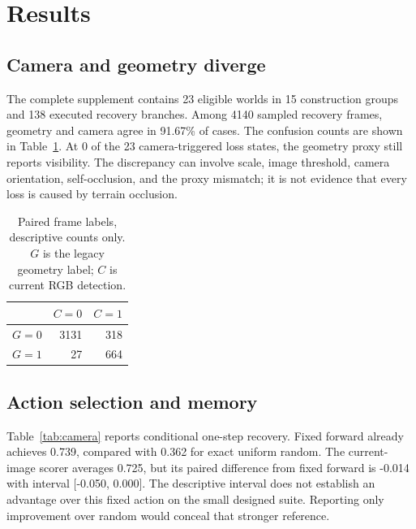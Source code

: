 \documentclass[10pt,twocolumn,a4paper]{article}
\begin{document}
\section{Results}
\subsection{Camera and geometry diverge}
The complete supplement contains 23 eligible worlds in 15 construction groups and 138 executed recovery branches. Among 4140 sampled recovery frames, geometry and camera agree in 91.67\% of cases. The confusion counts are shown in Table~\ref{tab:confusion}. At 0 of the 23 camera-triggered loss states, the geometry proxy still reports visibility. The discrepancy can involve scale, image threshold, camera orientation, self-occlusion, and the proxy mismatch; it is not evidence that every loss is caused by terrain occlusion.

\begin{table}[t]
\centering\small
\caption{Paired frame labels, descriptive counts only. $G$ is the legacy geometry label; $C$ is current RGB detection.}
\begin{tabular}{lrr}\toprule & $C=0$ & $C=1$\\\midrule
$G=0$ & 3131 & 318\\
$G=1$ & 27 & 664\\\bottomrule
\end{tabular}\label{tab:confusion}
\end{table}

\subsection{Action selection and memory}
Table~\ref{tab:camera} reports conditional one-step recovery. Fixed forward already achieves 0.739, compared with 0.362 for exact uniform random. The current-image scorer averages 0.725, but its paired difference from fixed forward is -0.014 with interval [-0.050, 0.000]. The descriptive interval does not establish an advantage over this fixed action on the small designed suite. Reporting only improvement over random would conceal that stronger reference.
\end{document}
